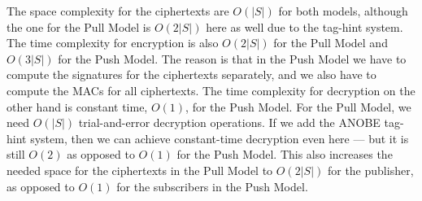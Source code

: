 %
%
%
%
%
%
%
%

The space complexity for the ciphertexts are \(O(|S|)\) for both models, 
although the one for the Pull Model is \(O(2|S|)\) here as well due to the 
tag-hint system.
The time complexity for encryption is also \(O(2|S|)\) for the Pull Model and 
\(O(3|S|)\) for the Push Model.
The reason is that in the Push Model we have to compute the signatures for the 
ciphertexts separately, and we also have to compute the \acp{MAC} for all 
ciphertexts.
The time complexity for decryption on the other hand is constant time, 
\(O(1)\), for the Push Model.
For the Pull Model, we need \(O(|S|)\) trial-and-error decryption operations.
If we add the \ac{ANOBE} tag-hint system, then we can achieve constant-time 
decryption even here --- but it is still \(O(2)\) as opposed to \(O(1)\) for 
the Push Model.
This also increases the needed space for the ciphertexts in the Pull Model to 
\(O(2|S|)\) for the publisher, as opposed to \(O(1)\) for the subscribers in 
the Push Model.

%
%
%
%


